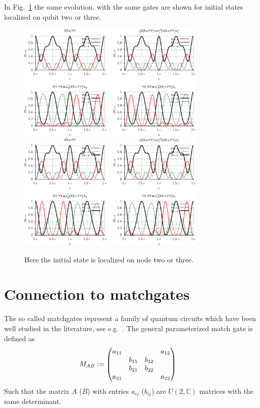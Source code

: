 \documentclass[aps,pra,12pt,nofootinbib,superscriptaddress,longbibliography,showpacs]{revtex4-1}
\theoremstyle{plain}
\theoremstyle{definition}
\newcommand{\CC}{{\mathbb C}}  %
\begin{document}
In Fig.~\ref{fig:init23} the same evolution, with the same gates are shown for
initial states localized on qubit two or three.


\begin{figure}[p]
  \centering
  \includegraphics[width=0.8\textwidth]{3qbit_010}\\
  \vskip 10pt
  \includegraphics[width=0.8\textwidth]{3qbit_100}
  \caption{Here the initial state is localized on node two or three.}
  \label{fig:init23}
\end{figure}

\section{Connection to matchgates} 

The so called matchgates represent a family of quantum circuits which have been 
well studied in the literature, see e.g.~\cite{JM08, RFSW10}.  The general parameterized match gate is defined as 
\begin{align}
\notag
M_{AB} &:= 
\begin{pmatrix}
a_{11} & & & a_{12}\\
& b_{11} & b_{12} \\
& b_{21} & b_{22} \\
a_{21} & & & a_{22}
\end{pmatrix}
\end{align}
Such that the matrix $A$ ($B$) with entries $a_{ij}$ ($b_{ij}$) are $U(2,\CC)$ matrices with the same determinant.  
\end{document}
